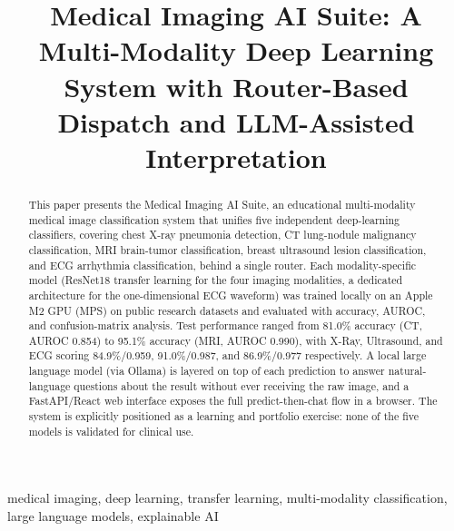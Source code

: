 \documentclass[conference]{IEEEtran}
\begin{document}
\title{Medical Imaging AI Suite: A Multi-Modality Deep Learning System with Router-Based Dispatch and LLM-Assisted Interpretation}

\author{
\and
{}
}

\maketitle

\begin{abstract}
This paper presents the Medical Imaging AI Suite, an educational multi-modality medical image classification system that unifies five independent deep-learning classifiers, covering chest X-ray pneumonia detection, CT lung-nodule malignancy classification, MRI brain-tumor classification, breast ultrasound lesion classification, and ECG arrhythmia classification, behind a single router. Each modality-specific model (ResNet18 transfer learning for the four imaging modalities, a dedicated architecture for the one-dimensional ECG waveform) was trained locally on an Apple M2 GPU (MPS) on public research datasets and evaluated with accuracy, AUROC, and confusion-matrix analysis. Test performance ranged from 81.0\% accuracy (CT, AUROC 0.854) to 95.1\% accuracy (MRI, AUROC 0.990), with X-Ray, Ultrasound, and ECG scoring 84.9\%/0.959, 91.0\%/0.987, and 86.9\%/0.977 respectively. A local large language model (via Ollama) is layered on top of each prediction to answer natural-language questions about the result without ever receiving the raw image, and a FastAPI/React web interface exposes the full predict-then-chat flow in a browser. The system is explicitly positioned as a learning and portfolio exercise: none of the five models is validated for clinical use.
\end{abstract}

\begin{IEEEkeywords}
medical imaging, deep learning, transfer learning, multi-modality classification, large language models, explainable AI
\end{IEEEkeywords}
\end{document}

